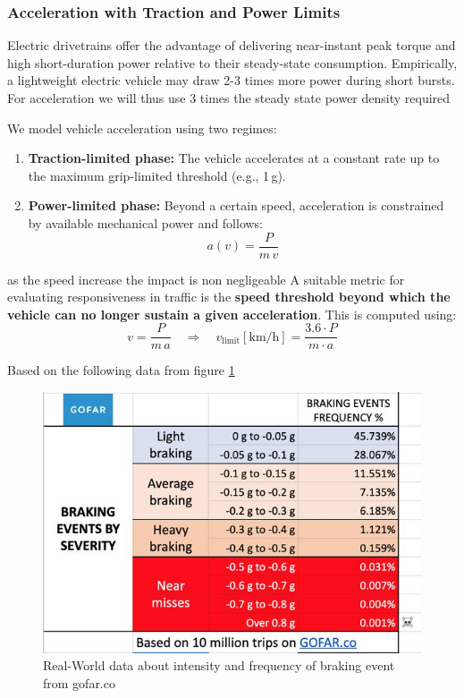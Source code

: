 \subsubsection*{Acceleration with Traction and Power Limits}

Electric drivetrains offer the advantage of delivering near-instant peak torque and high short-duration power relative to their steady-state consumption. Empirically, a lightweight electric vehicle may draw 2-3 times more power during short bursts. For acceleration we will thus use 3 times the steady state power density required

We model vehicle acceleration using two regimes:
\begin{enumerate}
    \item \textbf{Traction-limited phase:} The vehicle accelerates at a constant rate up to the maximum grip-limited threshold (e.g., 1\,g).
    \item \textbf{Power-limited phase:} Beyond a certain speed, acceleration is constrained by available mechanical power and follows:
    \[
        a(v) = \frac{P}{m\,v}
    \]
\end{enumerate}
as the speed increase the impact is non negligeable
A suitable metric for evaluating responsiveness in traffic is the \textbf{speed threshold beyond which the vehicle can no longer sustain a given acceleration}. This is computed using:
\[
v = \frac{P}{m\,a}
\quad\Rightarrow\quad
v_{\text{limit}} [\mathrm{km/h}] = \frac{3.6 \cdot P}{m \cdot a}
\]

\noindent
\newpage

Based on the following data from figure \ref{fig:break_event}

\begin{figure}[h!]
    \centering
    \includegraphics[width=0.5\linewidth]{Figures/ch3_gofarBrakingEvent.png}
    \caption{Real-World data about intensity and frequency of braking event from gofar.co\cite{noauthor_how_nodate}}
    \label{fig:break_event}
\end{figure}

